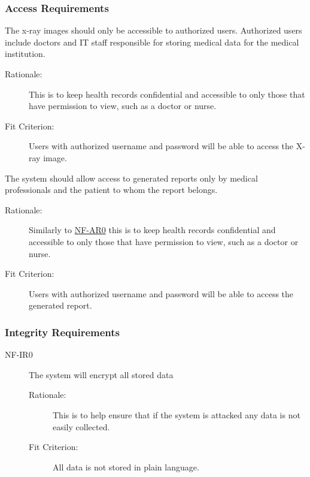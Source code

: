 \documentclass[12pt]{article}
\begin{document}
\subsubsection{Access Requirements}
\begin{description}
\hypertarget{AR0}{}
    \item[NF-AR0] The x-ray images should only be accessible to authorized users. Authorized users include doctors and IT staff responsible for storing medical data for the medical institution. 
    \begin{description}
        \item[Rationale:] This is to keep health records confidential and accessible to only those that have permission to view, such as a doctor or nurse. 
        \item[Fit Criterion:] Users with authorized username and password will be able to access the X-ray image.
    \end{description}
    \item[NF-AR1] The system should allow access to generated reports only by medical professionals and the patient to whom the report belongs. 
    \begin{description}
        \item[Rationale:] Similarly to \hyperlink{AR0}{NF-AR0} this is to keep health records confidential and accessible to only those that have permission to view, such as a doctor or nurse. 
        \item[Fit Criterion:] Users with authorized username and password will be able to access the generated report.
    \end{description}
\end{description}


\subsubsection{Integrity Requirements}
\begin{description}
    \item[NF-IR0] The system will encrypt all stored data 
    \begin{description}
        \item[Rationale:] This is to help ensure that if the system is attacked any data is not easily collected. 
        \item[Fit Criterion:] All data is not stored in plain language. 
    \end{description}
\end{description}
\end{document}
